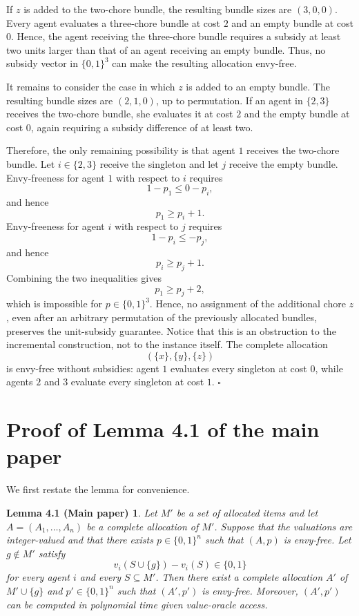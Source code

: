 \documentclass[sigconf,anonymous,nonacm]{aamas}
\newtheorem*{lemmafourone}{Lemma 4.1 (Main paper)}
\begin{document}
\begin{example}
If $z$ is added to the two-chore bundle, the resulting bundle sizes are $(3,0,0)$. Every agent evaluates a three-chore bundle at cost $2$ and an empty bundle at cost $0$. Hence, the agent receiving the three-chore bundle requires a subsidy at least two units larger than that of an agent receiving an empty bundle. Thus, no subsidy vector in $\{0,1\}^3$ can make the resulting allocation envy-free.

It remains to consider the case in which $z$ is added to an empty bundle. The resulting bundle sizes are $(2,1,0)$, up to permutation. If an agent in $\{2,3\}$ receives the two-chore bundle, she evaluates it at cost $2$ and the empty bundle at cost $0$, again requiring a subsidy difference of at least two.

Therefore, the only remaining possibility is that agent $1$ receives the two-chore bundle. Let $i\in\{2,3\}$ receive the singleton and let $j$ receive the empty bundle. Envy-freeness for agent $1$ with respect to $i$ requires
\[
1-p_1\le 0-p_i,
\]
and hence
\[
p_1\ge p_i+1.
\]
Envy-freeness for agent $i$ with respect to $j$ requires \[
1-p_i\le -p_j,
\] and hence
\[
p_i\ge p_j+1.
\] Combining the two inequalities gives
\[
p_1\ge p_j+2,
\] which is impossible for $p\in\{0,1\}^3$. Hence, no assignment of the additional chore $z$, even after an arbitrary permutation of the previously allocated bundles, preserves the unit-subsidy guarantee. Notice that this is an obstruction to the incremental construction, not to the instance itself. The complete allocation
\[
(\{x\},\{y\},\{z\})
\] is envy-free without subsidies: agent $1$ evaluates every singleton at cost $0$, while agents $2$ and $3$ evaluate every singleton at cost $1$. \hfill $\square$
\end{example}



\section{Proof of Lemma 4.1 of the main paper}
We first restate the lemma for convenience.
\begin{lemmafourone}
Let $M'$ be a set of allocated items and let $A=(A_1,\ldots,A_n)$ be a complete allocation of $M'$. Suppose that the valuations are integer-valued and that there exists $p\in\{0,1\}^n$ such that $(A,p)$ is envy-free. Let $g\notin M'$ satisfy
\[
v_i(S\cup\{g\})-v_i(S)\in\{0,1\}
\]
for every agent $i$ and every $S\subseteq M'$. Then there exist a complete allocation $A'$ of $M'\cup\{g\}$ and $p'\in\{0,1\}^n$ such that $(A',p')$ is envy-free. Moreover, $(A',p')$ can be computed in polynomial time given value-oracle access.
\end{lemmafourone}
\end{document}
